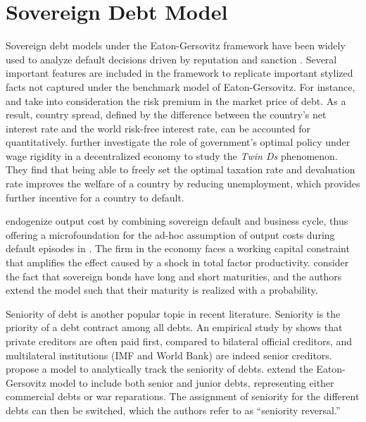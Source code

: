 \section{Sovereign Debt Model}
Sovereign debt models under the Eaton-Gersovitz framework have been widely used to analyze default decisions driven by reputation and sanction \citep*{Eaton-Gersovitz-81}.
Several important features are included in the framework to replicate important stylized facts not captured under the benchmark model of Eaton-Gersovitz.
For instance,
\citet{Aguiar-Gopinath-06} and \citet{Arellano-08} take into consideration the risk premium in the market price of debt. As a result, country spread, defined by the difference between the country's net interest rate and the world risk-free interest rate, can be accounted for quantitatively.
\citet{Na-18} further investigate the role of government's optimal policy under wage rigidity in a decentralized economy to study the \emph{Twin Ds} phenomenon. They find that being able to freely set the optimal taxation rate and devaluation rate improves the welfare of a country by reducing unemployment, which provides further incentive for a country to default.

\citet*{Mendoza-Yue-12} endogenize output cost by combining sovereign default and business cycle, thus offering a microfoundation for the ad-hoc assumption of output costs during default episodes in \citet{Arellano-08}. The firm in the economy faces a working capital constraint that amplifies the effect caused by a shock in total factor productivity.
\citet*{Chatterjee-12} consider the fact that sovereign bonds have long and short maturities, and the authors extend the model such that their maturity is realized with a probability.

Seniority of debt is another popular topic in recent literature. Seniority is the priority of a debt contract among all debts. An empirical study by \citet*{Schlegl-Trebesch-Wright-19} shows that private creditors are often paid first, compared to bilateral official creditors, and multilateral institutions (IMF and World Bank) are indeed senior creditors. \citet*{Chatterjee-15-seniority} propose a model to analytically track the seniority of debts. \citet*{Ho-Ritschl-23} extend the Eaton-Gersovitz model to include both senior and junior debts, representing either commercial debts or war reparations. The assignment of seniority for the different debts can then be switched, which the authors refer to as ``seniority reversal.''

